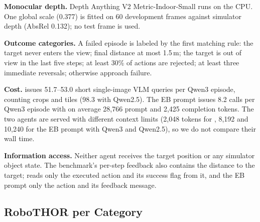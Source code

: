 \noindent\textbf{Monocular depth.} Depth Anything V2 Metric-Indoor-Small runs on the CPU. One global scale
(0.377) is fitted on 60 development frames against simulator depth (AbsRel 0.132); no test frame is used.

\noindent\textbf{Outcome categories.} A failed episode is labeled by the first matching rule: the target never
enters the view; final distance at most 1.5\,m; the target is out of view in the last five steps; at least 30\%
of actions are rejected; at least three immediate reversals; otherwise approach failure.

\noindent\textbf{Cost.} \ours issues 51.7--53.0 short single-image VLM queries per Qwen3 episode, counting crops
and tiles (98.3 with Qwen2.5). The EB prompt issues 8.2 calls per Qwen3 episode with on average
28{,}766 prompt and 2{,}425 completion tokens. The two agents are served with different context limits (2{,}048
tokens for \ours, 8{,}192 and 10{,}240 for the EB prompt with Qwen3 and Qwen2.5), so we do not compare their wall
time.

\noindent\textbf{Information access.} Neither agent receives the target position or any simulator object state.
The benchmark's per-step feedback also contains the distance to the target; \ours reads only the executed action
and its success flag from it, and the EB prompt only the action and its feedback message.

\subsection{RoboTHOR per Category}
\label{app:robothor}
\begin{table}[t]
\centering\scriptsize
\caption{\ours on the RoboTHOR validation split by target category (150 episodes each). Episodes with simulator
errors count as failures.}
\label{tab:app-robo-categories}
\end{table}
